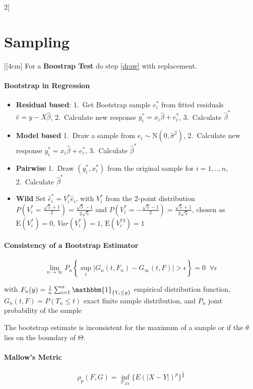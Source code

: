 \documentclass[8pt]{extarticle}
\begin{document}
\begin{multicols}{2}[\section{Sampling}][4cm]
For a \textbf{Boostrap Test} do step \ref{draw} with replacement.

\paragraph{Bootstrap in \textbf{Regression}}
\begin{itemize}
\item \textbf{Residual based}: 1.~Get Bootstrap sample $e_i^*$ from fitted residuals $\hat{e} = y- X\hat{\beta}$, 2.~Calculate new response $y_i^* = x_i\hat{\beta} + e_i^*$, 3.~Calculate $\hat{\beta}^*$
\item \textbf{Model based} 1.~Draw a sample from $e_i \sim \mathrm{N}(0, \hat{\sigma}^2)$, 2.~Calculate new response $y_i^* = x_i\hat{\beta} + e_i^*$, 3.~Calculate $\hat{\beta}^*$
\item \textbf{Pairwise} 1.~Draw $(y_i^*, x_i^*)$ from the original sample for $i=1,..,n$, 2.~Calculate $\hat{\beta}^*$
\item \textbf{Wild} Set $\hat{e}_i^* = V_i^*\hat{e}_i$, with $V_i^*$ from the 2-point distribution $P(V_i^* {=}\frac{\sqrt{5}{+}1}{2})=\frac{\sqrt{5}{-}1}{2\sqrt{5}}$ and $P(V_i^* {=}{-}\frac{\sqrt{5}{-}1}{2})=\frac{\sqrt{5}{+}1}{2\sqrt{5}}$, chosen as $\mathrm{E}(V_i^*)=0$, $Var(V_i^*)=1$, $\mathrm{E}(V_i^{*3})=1$
\end{itemize}

\paragraph{Consistency of a Bootstrap Estimator} 

$$ \underset{n\rightarrow\infty}{\lim} P_n\left\{\underset{t}{\sup}\left|G_n(t,F_n)-G_\infty(t,F)\right|>\epsilon\right\} = 0  \;\; \forall \epsilon $$

\noindent with $F_n(y) = \frac{1}{n}\sum_{i=1}^n \mathbbm{1}_{\{Y_i\leq y\}}$ empirical distribution function, $G_n(t, F) = P(T_n\leq t)$ exact finite sample distribution, and $P_n$ joint probability of the sample

\vspace{0.5em}
\noindent The bootstrap estimate is inconsistent for the maximum of a sample or if the $\theta$ lies on the boundary of $\Theta$.

\paragraph{Mallow's Metric}

$$\rho_p(F,G) = \underset{\mathcal{T}_{XY}}{\inf}\{E(|X-Y|)^p\}^\frac{1}{p} $$


\end{multicols}
\end{document}
